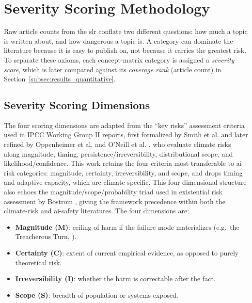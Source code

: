 

	\section{Severity Scoring Methodology}\label{sec:severity_scoring_methodology}

	Raw article counts from the \gls{slr} conflate two different questions: how much a topic is written about, and how dangerous a topic is. A category can dominate the literature because it is easy to publish on, not because it carries the greatest risk. To separate these axioms, each concept-matrix category is assigned a \emph{severity score}, which is later compared against its \emph{coverage rank} (article count) in Section~\ref{subsec:results_quantitative}.

	\subsection*{Severity Scoring Dimensions}

	The four scoring dimensions are adapted from the ``key risks'' assessment criteria used in IPCC Working Group II reports, first formalized by Smith et al. \cite{smith2009assessing} and later refined by Oppenheimer et al. \cite{oppenheimer2014emergent} and O'Neill et al. \cite{oneill2017ipcc}, who evaluate climate risks along magnitude, timing, persistence/irreversibility, distributional scope, and likelihood/confidence. This work retains the four criteria most transferable to \gls{ai} risk categories: magnitude, certainty, irreversibility, and scope, and drops timing and adaptive-capacity, which are climate-specific. This four-dimensional structure also echoes the magnitude/scope/probability triad used in existential risk assessment by Bostrom \cite{bostrom2013existential}, giving the framework precedence within both the climate-risk and \gls{ai}-safety literatures. The four dimensions are:

	\begin{itemize}
		\item \textbf{Magnitude (M)}: ceiling of harm if the failure mode materializes (e.g.\ the Treacherous Turn, \cite{bostrom2014superintelligence}).
		\item \textbf{Certainty (C)}: extent of current empirical evidence, as opposed to purely theoretical risk.
		\item \textbf{Irreversibility (I)}: whether the harm is correctable after the fact.
		\item \textbf{Scope (S)}: breadth of population or systems exposed.
	\end{itemize}

